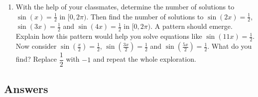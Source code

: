 \begin{enumerate}

\setcounter{enumi}{\value{HW}}

\item With the help of your classmates, determine the number of solutions to $\sin(x) = \frac{1}{2}$ in $[0,2\pi)$.  Then find the number of solutions to $\sin(2x) = \frac{1}{2}$,  $\sin(3x) = \frac{1}{2}$ and $\sin(4x) = \frac{1}{2}$ in $[0,2\pi)$.  A pattern should emerge.  Explain how this pattern would help you solve equations like $\sin(11x) = \frac{1}{2}$.  Now consider $\sin\left(\frac{x}{2}\right)  = \frac{1}{2}$,  $\sin\left(\frac{3x}{2}\right)  = \frac{1}{2}$ and $\sin\left(\frac{5x}{2}\right)  = \frac{1}{2}$.  What do you find?  Replace $\dfrac{1}{2}$ with $-1$ and repeat the whole exploration.

\end{enumerate}


\newpage

\subsection{Answers}

